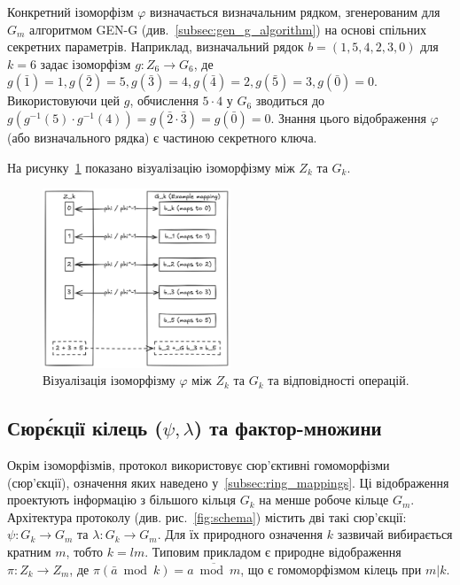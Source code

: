 Конкретний ізоморфізм $\varphi$ визначається визначальним рядком, згенерованим для $G_m$ алгоритмом GEN-G (див.~\ref{subsec:gen_g_algorithm}) на основі спільних секретних параметрів.
Наприклад, визначальний рядок $b=(1, 5, 4, 2, 3, 0)$ для $k=6$ задає ізоморфізм $g: Z_6 \to G_6$, де $g(\bar{1})=1, g(\bar{2})=5, g(\bar{3})=4, g(\bar{4})=2, g(\bar{5})=3, g(\bar{0})=0$.
Використовуючи цей $g$, обчислення $5 \cdot 4$ у $G_6$ зводиться до $g(g^{-1}(5) \cdot g^{-1}(4)) = g(\bar{2} \cdot \bar{3}) = g(\bar{0}) = 0$.
Знання цього відображення $\varphi$ (або визначального рядка) є частиною секретного ключа.

На рисунку~\ref{fig:gk_zk_iso} показано візуалізацію ізоморфізму між $Z_k$ та $G_k$.
\begin{figure}[ht]
    \centering
    \includegraphics[width=0.5\textwidth]{pictures/G_k vs Z_k Isomorphism Example}
    \caption{Візуалізація ізоморфізму $\varphi$ між $Z_k$ та $G_k$ та відповідності операцій.}
    \label{fig:gk_zk_iso}
\end{figure}

\subsection{Сюр\'єкції кілець ($\psi, \lambda$) та фактор-множини}
\label{subsec:ring_surjection}
Окрім ізоморфізмів, протокол використовує сюр'єктивні гомоморфізми (сюр'єкції), означення яких наведено у~\ref{subsec:ring_mappings}.
Ці відображення проектують інформацію з більшого кільця $G_k$ на менше робоче кільце $G_m$.
Архітектура протоколу (див. рис.~\ref{fig:schema}) містить дві такі сюр'єкції: $\psi: G_k \to G_m$ та $\lambda: G_k \to G_m$.
Для їх природного означення $k$ зазвичай вибирається кратним $m$, тобто $k=lm$.
Типовим прикладом є природне відображення $\pi: Z_k \to Z_m$, де $\pi(\bar{a} \bmod k) = \overline{a \bmod m}$, що є гомоморфізмом кілець при $m|k$.

